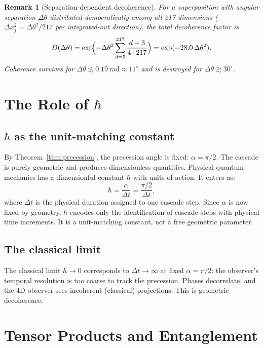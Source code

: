 \documentclass[12pt,a4paper]{article}
\newtheorem{remark}[theorem]{Remark}
\begin{document}
\begin{remark}[Separation-dependent decoherence]
For a superposition with angular separation $\Delta\theta$ distributed democratically
among all 217 dimensions ($\Delta x_j^2 = \Delta\theta^2/217$ per integrated-out
direction), the total decoherence factor is
\[
D(\Delta\theta) = \exp\!\Bigl(-\Delta\theta^2\sum_{d=5}^{217}\frac{d+3}{4\cdot 217}\Bigr)
= \exp(-28.0\,\Delta\theta^2).
\]
Coherence survives for $\Delta\theta\lesssim 0.19\,\mathrm{rad}\approx 11^\circ$ and is
destroyed for $\Delta\theta\gtrsim 30^\circ$.
\end{remark}

\section{The Role of \texorpdfstring{$\hbar$}{hbar}}
\label{sec:hbar}

\subsection{\texorpdfstring{$\hbar$}{hbar} as the unit-matching constant}

By Theorem~\ref{thm:precession}, the precession angle is fixed: $\alpha=\pi/2$. The cascade
is purely geometric and produces dimensionless quantities. Physical quantum mechanics has a
dimensionful constant $\hbar$ with units of action. It enters as:
\[
\hbar = \frac{\alpha}{\Delta t} = \frac{\pi/2}{\Delta t},
\]
where $\Delta t$ is the physical duration assigned to one cascade step. Since $\alpha$ is
now fixed by geometry, $\hbar$ encodes only the identification of cascade steps with
physical time increments. It is a unit-matching constant, not a free geometric parameter.

\subsection{The classical limit}

The classical limit $\hbar\to 0$ corresponds to $\Delta t\to\infty$ at fixed
$\alpha=\pi/2$: the observer's temporal resolution is too coarse to track the precession.
Phases decorrelate, and the 4D observer sees incoherent (classical) projections. This is
geometric decoherence.

\section{Tensor Products and Entanglement}\label{sec:tensor-products-and-entanglement}
\end{document}

